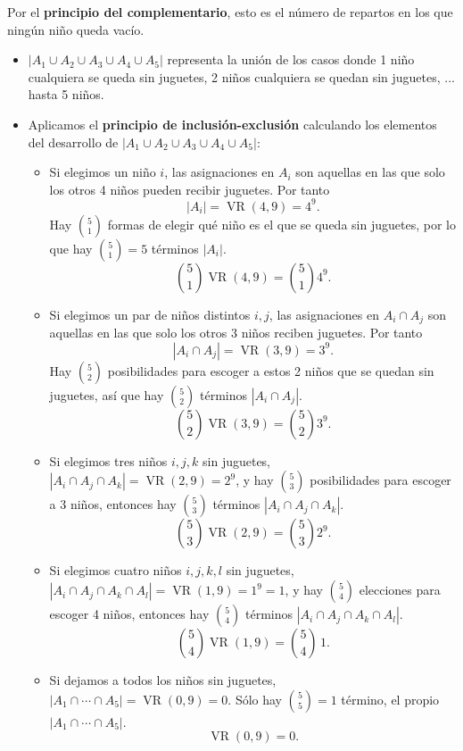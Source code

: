 \documentclass[a4paper,12pt]{article}
\begin{document}
  \begin{ejercicio}[title=Ejercicio 37]
  
  Por el \textbf{principio del complementario}, esto es el número de repartos en los que ningún niño queda vacío.
  
  \begin{itemize}

  \item \(|A_1\cup A_2\cup A_3\cup A_4\cup A_5|\) representa la unión de los casos donde 1 niño cualquiera se queda sin juguetes, 2 niños cualquiera se quedan sin juguetes, ... hasta 5 niños.

  \item Aplicamos el \textbf{principio de inclusión-exclusión} calculando los elementos del desarrollo de $|A_1\cup A_2\cup A_3\cup A_4\cup A_5|$:
  \begin{itemize}
    \item Si elegimos un niño $i$, las asignaciones en \(A_i\) son aquellas en las que solo los otros 4 niños pueden recibir juguetes. Por tanto
    \[
    |A_i| = \operatorname{VR}(4,9)=4^{9}.
    \]
    Hay \(\binom{5}{1}\) formas de elegir qué niño es el que se queda sin juguetes, por lo que hay \(\binom{5}{1} = 5\) términos $|A_i|$.
    \[
    \binom{5}{1}\operatorname{VR}(4,9)=\binom{5}{1}4^{9}.
    \]

    \item Si elegimos un par de niños distintos \(i,j\), las asignaciones en \(A_i\cap A_j\) son aquellas en las que solo los otros 3 niños reciben juguetes. Por tanto
    \[
    |A_i\cap A_j| = \operatorname{VR}(3,9)=3^{9}.
    \]
    Hay \(\binom{5}{2}\) posibilidades para escoger a estos 2 niños que se quedan sin juguetes, así que hay \(\binom{5}{2}\) términos $|A_i \cap A_j|$.
    \[
    \binom{5}{2}\operatorname{VR}(3,9)=\binom{5}{2}3^{9}.
    \]

    \item Si elegimos tres niños $i,j,k$ sin juguetes, \(|A_{i}\cap A_{j}\cap A_{k}|=\operatorname{VR}(2,9)=2^{9}\), y hay \(\binom{5}{3}\) posibilidades para escoger a 3 niños, entonces hay \(\binom{5}{3}\) términos $|A_i \cap A_j \cap A_k|$.
    \[
    \binom{5}{3}\operatorname{VR}(2,9)=\binom{5}{3}2^{9}.
    \]

    \item Si elegimos cuatro niños $i,j,k,l$ sin juguetes, \(|A_{i}\cap A_j \cap A_k\cap A_{l}|=\operatorname{VR}(1,9)=1^{9}=1\), y hay \(\binom{5}{4}\) elecciones para escoger 4 niños, entonces hay \(\binom{5}{4}\) términos $|A_i \cap A_j \cap A_k \cap A_l|$.
    \[
    \binom{5}{4}\operatorname{VR}(1,9)=\binom{5}{4}\,1.
    \]

    \item Si dejamos a todos los niños sin juguetes, \(|A_{1}\cap \cdots \cap A_{5}|=\operatorname{VR}(0,9)=0\). Sólo hay \(\binom{5}{5} = 1\) término, el propio $|A_{1}\cap \cdots \cap A_{5}|$.
    \[
    \operatorname{VR}(0,9)=0.
    \]
  \end{itemize}
  \end{itemize}
\end{ejercicio}
\end{document}
